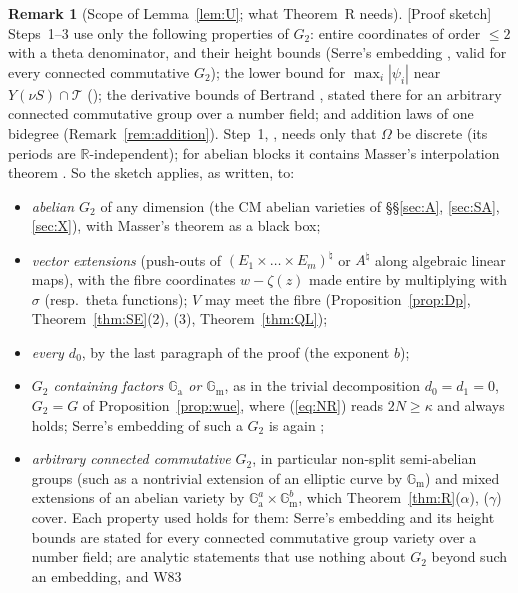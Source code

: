 \documentclass[11pt]{amsart}
\theoremstyle{definition}
\newtheorem{remark}[theorem]{Remark}
\newcommand{\R}{\mathbb{R}}
\newcommand{\Ga}{\mathbb{G}_{\mathrm a}}
\newcommand{\Gm}{\mathbb{G}_{\mathrm m}}
\newcommand{\lab}[1]{\textup{[#1]}}
\begin{document}
\begin{remark}[Scope of Lemma~\ref{lem:U}; what Theorem~R needs]\label{rem:Ugen}
\lab{Proof sketch} Steps~1--3 use only the following properties of $G_2$: entire coordinates of order $\le2$ with a theta
denominator, and their height bounds (Serre's embedding \cite[Prop.~5, Prop.~8]{Se79}, valid for every connected commutative
$G_2$); the lower bound for $\max_i|\psi_i|$ near $Y(\nu S)\cap\mathcal T$ (\cite[Lemme~2.2, p.~640]{W83}); the derivative
bounds of Bertrand \cite[App.~I, Lemme~7 and Corollaire, Lemme~1]{W79}, stated there for an arbitrary connected commutative
group over a number field; and addition laws of one bidegree (Remark~\ref{rem:addition}). Step~1, \cite[Prop.~2.1]{W83},
needs only that $\Omega$ be discrete (its periods are $\R$-independent); for abelian blocks it contains Masser's
interpolation theorem \cite[Lemme~2.3]{W83}. So the sketch applies, as written, to:
\begin{itemize}
\item[(a)] \emph{abelian $G_2$} of any dimension (the CM abelian varieties of \S\S\ref{sec:A}, \ref{sec:SA}, \ref{sec:X}),
with Masser's theorem as a black box;
\item[(b)] \emph{vector extensions} (push-outs of $(E_1\times\dots\times E_m)^\natural$ or $A^\natural$ along algebraic linear
maps), with the fibre coordinates $w-\zeta(z)$ made entire by multiplying with $\sigma$ (resp.\ theta functions); $V$ may meet
the fibre (Proposition~\ref{prop:Dp}, Theorem~\ref{thm:SE}(2), (3), Theorem~\ref{thm:QL});
\item[(c)] \emph{every $d_0$}, by the last paragraph of the proof (the exponent $b$);
\item[(d)] \emph{$G_2$ containing factors $\Ga$ or $\Gm$}, as in the trivial decomposition $d_0=d_1=0$, $G_2=G$ of
Proposition~\ref{prop:wue}, where (\ref{eq:NR}) reads $2N\ge\kappa$ and always holds; Serre's embedding of such a $G_2$ is
again \cite{Se79};
\item[(e)] \emph{arbitrary connected commutative $G_2$}, in particular non-split semi-abelian groups (such as a nontrivial
extension of an elliptic curve by $\Gm$) and mixed extensions of an abelian variety by $\Ga^a\times\Gm^b$, which
Theorem~\ref{thm:R}($\alpha$), ($\gamma$) cover. Each property used holds for them: Serre's embedding and its height bounds
\cite[Prop.~5, Prop.~8]{Se79} are stated for every connected commutative group variety over a number field;
\cite[Prop.~2.1, Lemme~2.2]{W83} are analytic statements that use nothing about $G_2$ beyond such an embedding, and W83

\end{itemize}
\end{remark}
\end{document}
